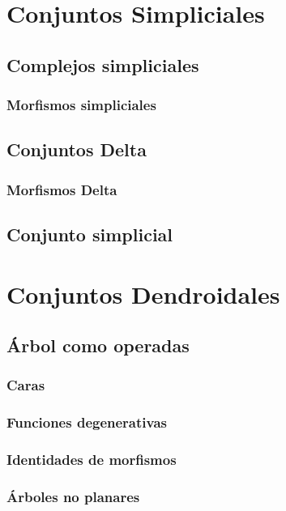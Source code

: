 \documentclass[11pt,a4paper,openright,oneside]{article}
\numberwithin{equation}{section}
\theoremstyle{definition}
\begin{document}

\section{Conjuntos Simpliciales}
\subsection{Complejos simpliciales}
\subsubsection{Morfismos simpliciales}
\subsection{Conjuntos Delta}
\subsubsection{Morfismos Delta}
\subsection{Conjunto simplicial}
\newpage


\section{Conjuntos Dendroidales}
\subsection{\'Arbol como operadas}
\subsubsection{Caras}
\subsubsection{Funciones degenerativas}
\subsubsection{Identidades de morfismos}
\subsubsection{\'Arboles no planares}
\end{document}
